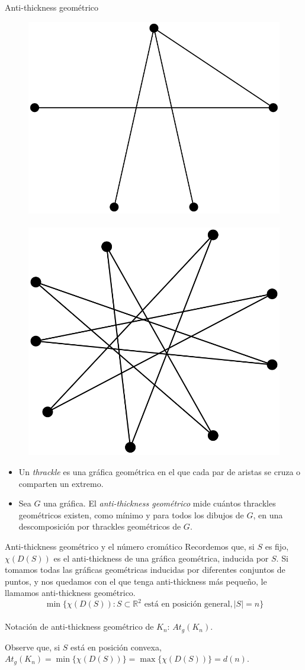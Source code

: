 \begin{frame}{Anti-thickness geométrico}
\begin{figure}
	\centering
	\includegraphics[width=0.35\linewidth]{images/thrackle_5}
	~\vrule~
	\includegraphics[width=0.3\linewidth]{images/thrackle_9}
\end{figure}
\begin{itemize}
	\item Un \emph{thrackle} es una gráfica geométrica en el que cada par de aristas se cruza o comparten un extremo.
	\item[] Sea $G$ una gráfica. El \emph{anti-thickness geométrico} mide cuántos thrackles geométricos existen, como mínimo y para todos los dibujos de $G$, en una descomposición por thrackles geométricos de $G$.
\end{itemize}

\end{frame}
\begin{frame}{Anti-thickness geométrico y el número cromático}
Recordemos que, si $S$ es fijo, $\chi(D(S))$ es el anti-thickness de una gráfica geométrica, inducida por $S$. Si tomamos todas las gráficas geométricas inducidas por diferentes conjuntos de puntos, y nos quedamos con el que tenga anti-thickness más pequeño, le llamamos anti-thickness geométrico.
\[
\min\{ \chi(D(S)) : S \subset \mathbb{R}^2\text{ está en posición general}, |S| = n \}
\] 
\pause
\\[10pt]
Notación de anti-thickness geométrico de $K_n$: $At_g(K_n)$.

Observe que, si $S$ está en posición convexa, $At_g(K_n) = \min\{\chi(D(S)) \} = \max\{\chi(D(S)) \} = d(n)$.
\end{frame}




